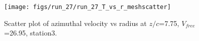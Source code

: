 \begin{figure}[H]
\centering
\texttt{[image: figs/run\_27/run\_27\_T\_vs\_r\_meshscatter]}
\caption{Scatter plot of azimuthal velocity vs radius at $z/c$=7.75, $V_{free}$=26.95, station3.}
\label{fig:run_27_T_vs_r_meshscatter}
\end{figure}


